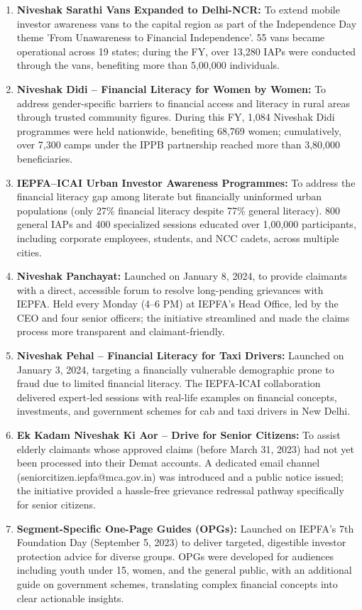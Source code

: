 \documentclass[openany]{book}
\begin{document}
\begin{enumerate}
    \item \textbf{Niveshak Sarathi Vans Expanded to Delhi-NCR:} To extend mobile investor awareness vans to the capital region as part of the Independence Day theme 'From Unawareness to Financial Independence'. 55 vans became operational across 19 states; during the FY, over 13,280 IAPs were conducted through the vans, benefiting more than 5,00,000 individuals.
    \item \textbf{Niveshak Didi – Financial Literacy for Women by Women:} To address gender-specific barriers to financial access and literacy in rural areas through trusted community figures. During this FY, 1,084 Niveshak Didi programmes were held nationwide, benefiting 68,769 women; cumulatively, over 7,300 camps under the IPPB partnership reached more than 3,80,000 beneficiaries.
    \item \textbf{IEPFA–ICAI Urban Investor Awareness Programmes:} To address the financial literacy gap among literate but financially uninformed urban populations (only 27\% financial literacy despite 77\% general literacy). 800 general IAPs and 400 specialized sessions educated over 1,00,000 participants, including corporate employees, students, and NCC cadets, across multiple cities.
    \item \textbf{Niveshak Panchayat:} Launched on January 8, 2024, to provide claimants with a direct, accessible forum to resolve long-pending grievances with IEPFA. Held every Monday (4–6 PM) at IEPFA's Head Office, led by the CEO and four senior officers; the initiative streamlined and made the claims process more transparent and claimant-friendly.
    \item \textbf{Niveshak Pehal – Financial Literacy for Taxi Drivers:} Launched on January 3, 2024, targeting a financially vulnerable demographic prone to fraud due to limited financial literacy. The IEPFA-ICAI collaboration delivered expert-led sessions with real-life examples on financial concepts, investments, and government schemes for cab and taxi drivers in New Delhi.
    \item \textbf{Ek Kadam Niveshak Ki Aor – Drive for Senior Citizens:} To assist elderly claimants whose approved claims (before March 31, 2023) had not yet been processed into their Demat accounts. A dedicated email channel (seniorcitizen.iepfa@mca.gov.in) was introduced and a public notice issued; the initiative provided a hassle-free grievance redressal pathway specifically for senior citizens.
    \item \textbf{Segment-Specific One-Page Guides (OPGs):} Launched on IEPFA's 7th Foundation Day (September 5, 2023) to deliver targeted, digestible investor protection advice for diverse groups. OPGs were developed for audiences including youth under 15, women, and the general public, with an additional guide on government schemes, translating complex financial concepts into clear actionable insights.

\end{enumerate}
\end{document}
